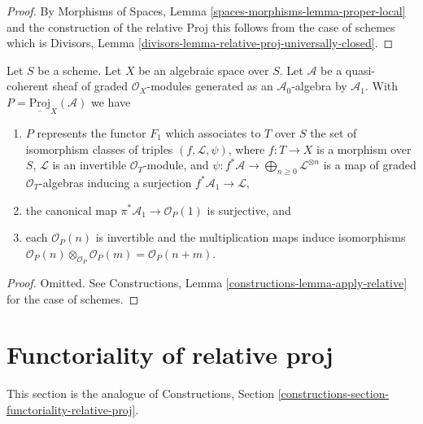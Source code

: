 \begin{proof}
By Morphisms of Spaces, Lemma
\ref{spaces-morphisms-lemma-proper-local}
and the construction of the relative Proj this follows from the
case of schemes which is
Divisors, Lemma \ref{divisors-lemma-relative-proj-universally-closed}.
\end{proof}

\begin{lemma}
\label{lemma-relative-proj-generated-in-degree-1}
Let $S$ be a scheme. Let $X$ be an algebraic space over $S$.
Let $\mathcal{A}$ be a quasi-coherent sheaf of graded $\mathcal{O}_X$-modules
generated as an $\mathcal{A}_0$-algebra by $\mathcal{A}_1$.
With $P = \underline{\text{Proj}}_X(\mathcal{A})$ we have
\begin{enumerate}
\item $P$ represents the functor $F_1$ which associates to
$T$ over $S$ the set of isomorphism classes of
triples $(f, \mathcal{L}, \psi)$, where $f : T \to X$ is a morphism
over $S$, $\mathcal{L}$ is an invertible $\mathcal{O}_T$-module, and
$\psi : f^*\mathcal{A} \to \bigoplus_{n \geq 0} \mathcal{L}^{\otimes n}$
is a map of graded $\mathcal{O}_T$-algebras inducing a surjection
$f^*\mathcal{A}_1 \to \mathcal{L}$,
\item the canonical map $\pi^*\mathcal{A}_1 \to \mathcal{O}_P(1)$ is
surjective, and
\item each $\mathcal{O}_P(n)$ is invertible
and the multiplication maps induce isomorphisms
$\mathcal{O}_P(n) \otimes_{\mathcal{O}_P} \mathcal{O}_P(m) =
\mathcal{O}_P(n + m)$.
\end{enumerate}
\end{lemma}

\begin{proof}
Omitted.
See Constructions, Lemma \ref{constructions-lemma-apply-relative}
for the case of schemes.
\end{proof}







\section{Functoriality of relative proj}
\label{section-functoriality-relative-proj}

\noindent
This section is the analogue of
Constructions, Section \ref{constructions-section-functoriality-relative-proj}.

